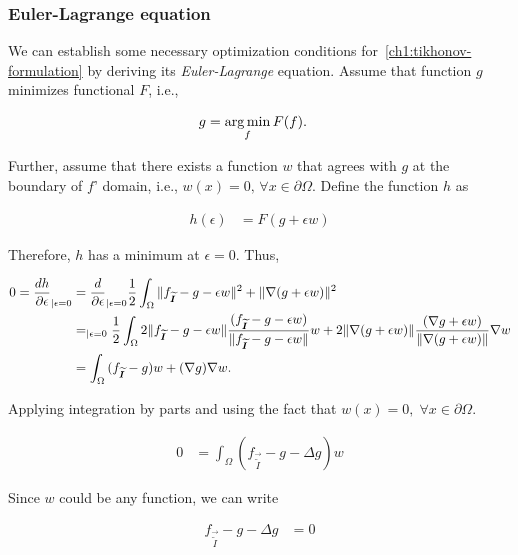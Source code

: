 \subsubsection{Euler-Lagrange equation}

We can establish some necessary optimization conditions for~\cref{ch1:tikhonov-formulation} by deriving its \emph{Euler-Lagrange} equation. Assume that function $g$ minimizes functional $F$, i.e.,

\begin{align*}
	g &= \operatorname*{arg\,min}_{f}{F(f)}.
\end{align*}

Further, assume that there exists a function $w$ that agrees with $g$ at the boundary of $f$' domain, i.e., $w(x)=0,\, \forall x \in \partial \Omega$. Define the function $h$ as

\begin{align*}
	h(\epsilon) &= F(g+\epsilon w)
\end{align*}

Therefore, $h$ has a minimum at $\epsilon=0$. Thus,

\begin{align*}
	0 = \frac{dh}{\partial \epsilon}_{| \epsilon=0} &= \frac{d}{\partial \epsilon}_{| \epsilon=0} \frac{1}{2} \int_{\Omega}{ \lVert f_{\bm{\widetilde{I}}} - g - \epsilon w\rVert^2 + \lVert \nabla (g + \epsilon w) \rVert^2} \\
	&= _{| \epsilon = 0} \frac{1}{2} \int_{\Omega}{ 2\lVert f_{\bm{\widetilde{I}}} - g - \epsilon w\rVert\frac{(f_{\bm{\widetilde{I}}} - g - \epsilon w) }{\lVert f_{\bm{\widetilde{I}}} - g - \epsilon w\rVert}w + 2\lVert \nabla (g + \epsilon w) \rVert\frac{(\nabla g + \epsilon w)}{\lVert \nabla (g + \epsilon w) \rVert}\nabla w} \\
	&= \int_{\Omega}{ (f_{\bm{\widetilde{I}}} - g)w + (\nabla g)\nabla w}. 	
\end{align*}

Applying integration by parts and using the fact that $w(x)=0,\; \forall x \in \partial \Omega$.

\begin{align*}
		0 &= \int_{\Omega} ( f_{\vec{\widetilde{I}}} - g - \Delta g )w
\end{align*}

Since $w$ could be any function, we can write

\begin{align}
	f_{\vec{\widetilde{I}}} - g - \Delta g &= 0
	\label{ch1:eq:variational-necessary-condition}
\end{align}



